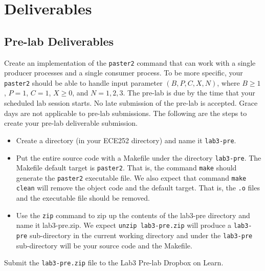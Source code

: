 
\section{Deliverables}
\subsection{Pre-lab Deliverables}
\label{sec:lab3-pre-lab-deliverable}
Create an implementation of the \verb+paster2+ command that can work with a single producer processes and a single consumer process. To be more specific, your \verb+paster2+ should be able to handle input parameter $(B, P, C, X, N)$, where $B \ge 1$, $P = 1$, $C = 1$, $X \ge 0$, and $N = 1, 2, 3$. The pre-lab is due by the time that your scheduled lab session starts. No late submission of the pre-lab is accepted. Grace days are not applicable to pre-lab submissions. The following are the steps to create your pre-lab deliverable submission.
\begin{itemize}
\item Create a directory (in your ECE252 directory) and name it \verb+lab3-pre+.
\item Put the entire source code with a Makefile under the directory \verb+lab3-pre+. The Makefile default target is \verb+paster2+. That is, the command \verb+make+ should generate the \verb+paster2+ executable file. We also expect that command \verb+make clean+ will remove the object code and the default target. That is, the \verb+.o+ files and the executable file should be removed.
\item Use the \verb+zip+ command to zip up the contents of the lab3-pre directory and name it lab3-pre.zip. We expect \verb+unzip lab3-pre.zip+ will produce a \verb+lab3-pre+ sub-directory in the current working directory and under the \verb+lab3-pre+ sub-directory will be your source code and the Makefile.
\end{itemize}
Submit the \verb+lab3-pre.zip+ file to the Lab3 Pre-lab Dropbox on Learn.


